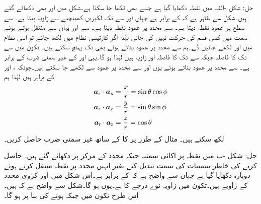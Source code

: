حل: شکل -الف میں نقطہ  دکھایا گیا ہے جسے  بھی لکھا جا سکتا ہے۔شکل میں  اور  بھی دکھائے گئے ہیں۔شکل سے ظاہر ہے کہ  کے برابر ہے جہاں  اور  سے  تک لکیریں کھینچنے سے زاویہ  بنتا ہے۔ سے  سطح پر عمود نقطہ  دیتا ہے۔ سے  محدد پر عمود نقطہ  دیتا ہے۔ سے  اور یہاں سے  منتقل ہوتے ہوئے  سمت میں کسی قسم کی حرکت نہیں کی جاتی لہٰذا اگر کارتیسی نظام میں  لکھا جائے تو اسی نظام میں  اور   لکھے جائیں گے۔ہم  سے  محدد پر عمود بناتے ہوئے بھی  تک پہنچ سکتے ہیں۔ تکون  میں  سے  تک کا فاصلہ  جبکہ  سے  تک کا فاصلہ  اور زاویہ  ہیں لہٰذا  ہو گا۔یہی   اور  کے غیر سمتی ضرب  کے برابر ہے۔ سے  محدد پر عمود بناتے ہوئے یوں  اور  سے  محدد پر عمود سے  لکھے جا سکتے ہیں۔چونکہ ،  اور  کے برابر  ہیں لہٰذا ہم
\begin{align*}
{\boldsymbol{a}}_{\textup{r}} \cdot {\boldsymbol{a}}_{\textup{x}}&=\frac{x}{r}=\sin \theta \cos \phi\\
{\boldsymbol{a}}_{\textup{r}} \cdot {\boldsymbol{a}}_{\textup{y}}&=\frac{y}{r}=\sin \theta \sin \phi\\
{\boldsymbol{a}}_{\textup{r}} \cdot {\boldsymbol{a}}_{\textup{z}}&=\frac{z}{r}=\cos \theta
\end{align*}
لکھ سکتے ہیں۔
مثال  کے طرز پر   کا  کے ساتھ غیر سمتی ضرب حاصل کریں۔

حل: شکل -ب میں نقطہ  پر اکائی سمتیہ  جبکہ محدد کے مرکز  پر  دکھائے گئے ہیں۔ حاصل کرنے کی خاطر سمتیات کی سمت تبدیل کئے بغیر انہیں  محدد پر نقطہ  منتقل کرتے ہوئے دوبارہ دکھایا گیا ہے جہاں سے واضح ہے کہ  کے برابر ہے۔اس شکل میں  اور  کروی محدد کے زاویے ہیں۔تکون  میں زاویہ  نوے درجے کا ہے۔یوں  ہو گا۔شکل سے واضح ہے کہ   ہیں۔اس طرح تکون  میں  جبکہ  ہونے کی بنا پر  ہو گا۔

